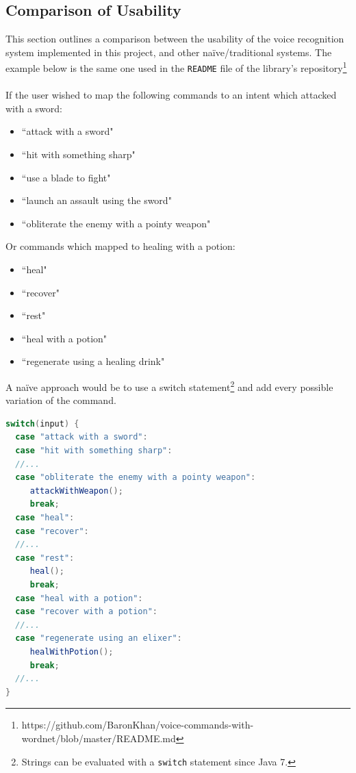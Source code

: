 \documentclass[11pt]{article}
\begin{document}
\begin{appendices}
\begin{table}[H]
\begin{tabular}{lll}
\end{tabular}
\end{table}

\newpage
\subsection{Comparison of Usability}
\label{appendix:comparison}

This section outlines a comparison between the usability of the voice recognition system implemented in this project, and other na\"ive/traditional systems. The example below is the same one used in the \texttt{README} file of the library's repository\footnote{https://github.com/BaronKhan/voice-commands-with-wordnet/blob/master/README.md}
\\
\\
If the user wished to map the following commands to an intent which attacked with a sword:

\begin{itemize}
\item ``attack with a sword"
\item ``hit with something sharp"
\item ``use a blade to fight"
\item ``launch an assault using the sword"
\item ``obliterate the enemy with a pointy weapon"
\end{itemize}

Or commands which mapped to healing with a potion:

\begin{itemize}
\item ``heal"
\item ``recover"
\item ``rest"
\item ``heal with a potion"
\item ``regenerate using a healing drink"
\end{itemize}

A na\"ive approach would be to use a switch statement\footnote{Strings can be evaluated with a \texttt{switch} statement since Java 7.} and add every possible variation of the command.

\begin{lstlisting}[language=Java]
switch(input) {
  case "attack with a sword":
  case "hit with something sharp":
  //...
  case "obliterate the enemy with a pointy weapon":
     attackWithWeapon();
     break;
  case "heal":
  case "recover":
  //...
  case "rest":
     heal();
     break;
  case "heal with a potion":
  case "recover with a potion":
  //...
  case "regenerate using an elixer":
     healWithPotion();
     break;
  //...
}
\end{lstlisting}


\end{appendices}
\end{document}
